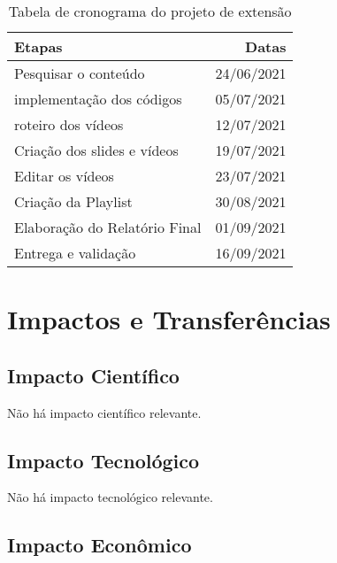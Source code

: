 \documentclass[a4paper,10pt]{article} %
\begin{document}
\begin{table}[ht] %
\begin{center}
 \caption{Tabela de cronograma do projeto de extensão}
\begin{tabular}{|l|r|}
  \hline \hline
  \textbf{Etapas} & \textbf{Datas} \\ \hline \hline
   Pesquisar o conteúdo & 24/06/2021 \\ \hline
   implementação dos códigos & 05/07/2021 \\ \hline
   roteiro dos vídeos & 12/07/2021 \\ \hline
   Criação dos slides e vídeos  & 19/07/2021 \\ \hline
   Editar os vídeos  & 23/07/2021 \\ \hline
   Criação da Playlist  & 30/08/2021 \\ \hline
   Elaboração do Relatório Final  & 01/09/2021 \\ \hline
   Entrega e validação & 16/09/2021 \\ \hline \hline
\end{tabular} 
\label{tab:resultados}
\end{center}
\end{table}


\section{Impactos e Transferências}

\subsection{Impacto Científico}

Não há impacto científico relevante.

\subsection{Impacto Tecnológico}

Não há impacto tecnológico relevante.

\subsection{Impacto Econômico}
\end{document}
